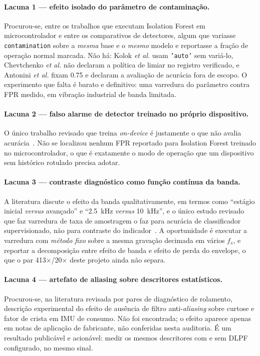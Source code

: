 \documentclass[11pt,a4paper]{article}
\begin{document}
\paragraph{Lacuna 1 --- efeito isolado do parâmetro de contaminação.} Procurou-se, entre os
trabalhos que executam Isolation Forest em microcontrolador e entre os comparativos de
detectores, algum que variasse \texttt{contamination} sobre a \emph{mesma} base e o
\emph{mesmo} modelo e reportasse a fração de operação normal marcada. Não há:
Kolok \emph{et al.} usam \texttt{'auto'} sem variá-lo, Chevtchenko \emph{et al.} não
declaram a política de limiar no registro verificado, e Antonini \emph{et al.} fixam
\num{0,75} e declaram a avaliação de acurácia fora de escopo. O experimento que falta é
barato e definitivo: uma varredura do parâmetro contra FPR medido, em vibração industrial
de banda limitada.

\paragraph{Lacuna 2 --- falso alarme de detector treinado no próprio dispositivo.} O único
trabalho revisado que treina \emph{on-device} é justamente o que não avalia
acurácia~\cite{antonini2023}. Não se localizou nenhum FPR reportado para Isolation Forest
treinado no microcontrolador, o que é exatamente o modo de operação que um dispositivo sem
histórico rotulado precisa adotar.

\paragraph{Lacuna 3 --- contraste diagnóstico como função contínua da banda.} A literatura
discute o efeito da banda qualitativamente, em termos como ``estágio inicial \emph{versus}
avançado'' e ``\SI{2,5}{\kilo\hertz} \emph{versus} \SI{10}{\kilo\hertz}'', e o único
estudo revisado que faz varredura de taxa de amostragem o faz para acurácia de
classificador supervisionado, não para contraste do indicador~\cite{elbouharrouti2024}. A
oportunidade é executar a varredura com \emph{método fixo} sobre a mesma gravação decimada
em vários $f_s$, e reportar a decomposição entre efeito de banda e efeito de perda do
envelope, o que o par \num{413}$\times$/\num{20}$\times$ deste projeto ainda não separa.

\paragraph{Lacuna 4 --- artefato de aliasing sobre descritores estatísticos.} Procurou-se,
na literatura revisada por pares de diagnóstico de rolamento, descrição experimental do
efeito de ausência de filtro anti-\emph{aliasing} sobre curtose e fator de crista em IMU de
consumo. Não foi encontrada; o efeito aparece apenas em notas de aplicação de fabricante,
não conferidas nesta auditoria. É um resultado publicável e acionável: medir
os mesmos descritores com e sem DLPF configurado, no mesmo sinal.
\end{document}
